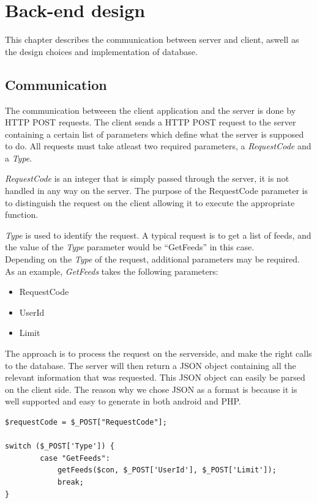 \chapter{Back-end design}
This chapter describes the communication between server and client, aswell as the design choices and
implementation of database. 

\section{Communication}
\label{sec:com}

The communication betweeen the client application and the server is done by HTTP POST requests.
The client sends a HTTP POST request to the server containing a certain list of parameters which
define what the server is supposed to do. All requests must take atleast two required parameters, a \textit{RequestCode} and a
\textit{Type}.

\textit{RequestCode} is an integer that is simply passed through the server, it is not handled in any
way on the server. The purpose of the RequestCode parameter is to distinguish the request on the client allowing
it to execute the appropriate function.

\textit{Type} is used to identify the request. A typical request is to get a list of feeds, and the
value of the \textit{Type} parameter would be ``GetFeeds'' in this case.\\

Depending on the \textit{Type} of the request, additional parameters may be required.\\

As an example, \textit{GetFeeds} takes the following parameters:
\begin{itemize}
\item RequestCode
\item UserId
\item Limit
\end{itemize}

The approach is to process the request on the serverside, and make the right calls to the
database. The server will then return a JSON object containing all the relevant information that was
requested. This JSON object can easily be parsed on the client side. The reason why we chose JSON as
a format is because it is well supported and easy to generate in both android and PHP.

\begin{lstlisting}[language=phpstyle, caption=getFeeds function call]
$requestCode = $_POST["RequestCode"];

switch ($_POST['Type']) {
        case "GetFeeds":
            getFeeds($con, $_POST['UserId'], $_POST['Limit']);
            break;
}
\end{lstlisting}

